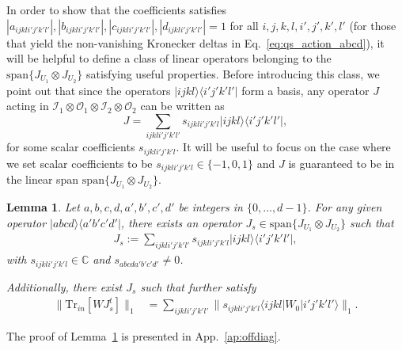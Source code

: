 \documentclass[a4paper,twocolumn,accepted=2022-10-23]{quantumarticle}
\newcommand{\bra}[1]{\langle {#1} \vert}
\newcommand{\ket}[1]{\vert {#1} \rangle}
\newcommand{\ketbra}[2]{\vert {#1} \rangle\!\langle {#2} \vert}
\newcommand{\Tr}[0]{{\mathrm{Tr}}}
\newtheorem{lem}{Lemma}
\theoremstyle{definition}
\begin{document}
In order to show that the coefficients satisfies $|a_{ijkli'j'k'l'}|, |b_{ijkli'j'k'l'}|, |c_{ijkli'j'k'l'}|, |d_{ijkli'j'k'l'}| = 1$ for all $i,j,k,l,i',j',k',l'$ (for those that yield the non-vanishing Kronecker deltas in Eq.~\eqref{eq:qs_action_abcd}), it will be helpful to define a class of linear operators belonging to the $\mathrm{span} \{ J_{U_1} \otimes J_{U_2} \}$ satisfying useful properties. Before introducing this class, we point out that since the operators $\ketbra{ijkl}{i'j'k'l'}$ form a basis, any operator $J$ acting in $\mathcal{I}_1\otimes\mathcal{O}_1\otimes\mathcal{I}_2\otimes\mathcal{O}_2$ can be written as
\begin{equation}
J = \sum_{ijkli'j'k'l'} s_{ijkli'j'k'l} \ketbra{ijkl}{i'j'k'l'},
\end{equation}
for some scalar coefficients $s_{ijkli'j'k'l}$. It will be useful to focus on the case where we set scalar coefficients to be $s_{ijkli'j'k'l}\in\{-1,0,1\}$ and $J$ is guaranteed to be in the linear span $\mathrm{span} \{ J_{U_1} \otimes J_{U_2} \}$.
%
\begin{lem}\label{lem:norm_equality}
Let $a,b,c,d,a',b',c',d'$ be integers in $\{0,\ldots,d-1\}$.
For any given operator $\ketbra{abcd}{a'b'c'd'}$, there exists an operator $J_{s} \in \mathrm{span} \{ J_{U_1} \otimes J_{U_2} \} $ such that
\begin{align}
J_{s} := \sum_{ijkli'j'k'l'} s_{ijkli'j'k'l} \ketbra{ijkl}{i'j'k'l'},  \label{eq:def_j_gs}
\end{align}
with $s_{ijkli'j'k'l} \in \mathbb{C}$ and $s_{abcda'b'c'd'} \neq 0$.

Additionally, there exist $J_s$ such that further satisfy
\begin{align}
\| \Tr_{in} [W J_s^t] \|_1 &= \sum_{ijkli'j'k'l'}  \| s_{ijkli'j'k'l} \bra{ijkl} W_0 \ket{i'j'k'l'} \|_1 \label{eq:norm_equality_ijkl}.
\end{align}
\end{lem}
The proof of Lemma~\ref{lem:norm_equality} is presented in App.~\ref{ap:offdiag}.
\end{document}
